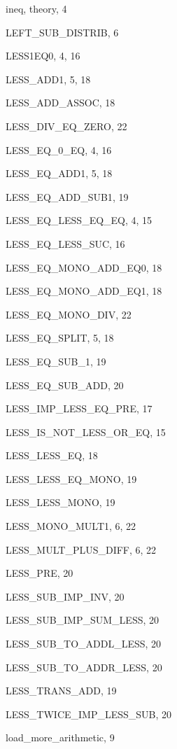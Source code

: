 \begin{theindex}
  \indexspace

  \item {\ptt ineq}, theory, 4

  \indexspace

  \item {\ptt LEFT\_SUB\_DISTRIB}, 6
  \item {\ptt LESS1EQ0}, 4, 16
  \item {\ptt LESS\_ADD1}, 5, 18
  \item {\ptt LESS\_ADD\_ASSOC}, 18
  \item {\ptt LESS\_DIV\_EQ\_ZERO}, 22
  \item {\ptt LESS\_EQ\_0\_EQ}, 4, 16
  \item {\ptt LESS\_EQ\_ADD1}, 5, 18
  \item {\ptt LESS\_EQ\_ADD\_SUB1}, 19
  \item {\ptt LESS\_EQ\_LESS\_EQ\_EQ}, 4, 15
  \item {\ptt LESS\_EQ\_LESS\_SUC}, 16
  \item {\ptt LESS\_EQ\_MONO\_ADD\_EQ0}, 18
  \item {\ptt LESS\_EQ\_MONO\_ADD\_EQ1}, 18
  \item {\ptt LESS\_EQ\_MONO\_DIV}, 22
  \item {\ptt LESS\_EQ\_SPLIT}, 5, 18
  \item {\ptt LESS\_EQ\_SUB\_1}, 19
  \item {\ptt LESS\_EQ\_SUB\_ADD}, 20
  \item {\ptt LESS\_IMP\_LESS\_EQ\_PRE}, 17
  \item {\ptt LESS\_IS\_NOT\_LESS\_OR\_EQ}, 15
  \item {\ptt LESS\_LESS\_EQ}, 18
  \item {\ptt LESS\_LESS\_EQ\_MONO}, 19
  \item {\ptt LESS\_LESS\_MONO}, 19
  \item {\ptt LESS\_MONO\_MULT1}, 6, 22
  \item {\ptt LESS\_MULT\_PLUS\_DIFF}, 6, 22
  \item {\ptt LESS\_PRE}, 20
  \item {\ptt LESS\_SUB\_IMP\_INV}, 20
  \item {\ptt LESS\_SUB\_IMP\_SUM\_LESS}, 20
  \item {\ptt LESS\_SUB\_TO\_ADDL\_LESS}, 20
  \item {\ptt LESS\_SUB\_TO\_ADDR\_LESS}, 20
  \item {\ptt LESS\_TRANS\_ADD}, 19
  \item {\ptt LESS\_TWICE\_IMP\_LESS\_SUB}, 20
  \item {\ptt load\_more\_arithmetic}, 9


\end{theindex}
